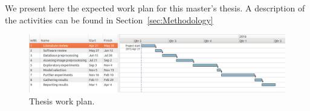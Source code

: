 We present here the expected work plan for this master's thesis. A description of the activities can be found in Section~\ref{sec:Methodology}
\begin{figure}[h]
	\centering
	\includegraphics[width = \textwidth]{plots/workplan.png}
	\caption[Thesis Work Plan]{Thesis work plan.}
	\label{fig:workplan}
\end{figure}

